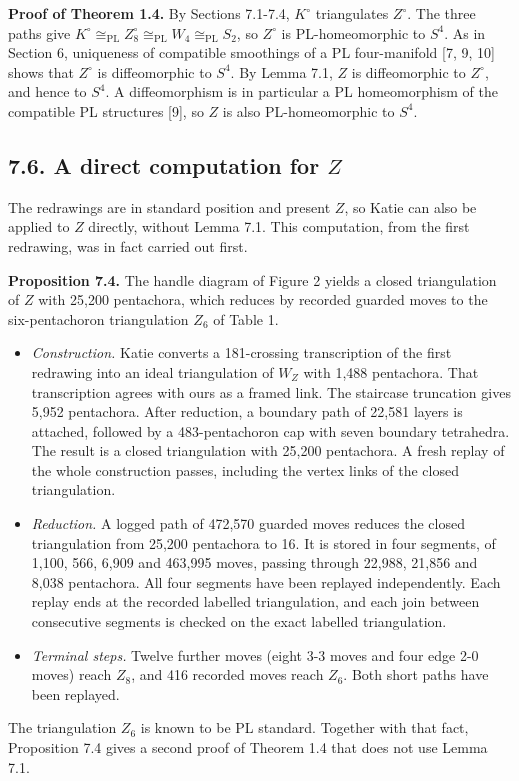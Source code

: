 \documentclass[11pt,letterpaper]{article}
\begin{document}
\medskip\noindent\textbf{Proof of Theorem 1.4.} By Sections 7.1-7.4, $K^\circ$ triangulates $Z^\circ$. The three paths give $K^\circ\cong_{\mathrm{PL}}Z^\circ_8\cong_{\mathrm{PL}}W_4\cong_{\mathrm{PL}}S_2$, so $Z^\circ$ is PL-homeomorphic to $S^4$. As in Section 6, uniqueness of compatible smoothings of a PL four-manifold [7, 9, 10] shows that $Z^\circ$ is diffeomorphic to $S^4$. By Lemma 7.1, $Z$ is diffeomorphic to $Z^\circ$, and hence to $S^4$. A diffeomorphism is in particular a PL homeomorphism of the compatible PL structures [9], so $Z$ is also PL-homeomorphic to $S^4$.

\subsection*{7.6. A direct computation for $Z$}
The redrawings are in standard position and present $Z$, so Katie can also be applied to $Z$ directly, without Lemma 7.1. This computation, from the first redrawing, was in fact carried out first.

\medskip\noindent\textbf{Proposition 7.4.} The handle diagram of Figure 2 yields a closed triangulation of $Z$ with 25,200 pentachora, which reduces by recorded guarded moves to the six-pentachoron triangulation $Z_6$ of Table 1.
\begin{itemize}
\item \emph{Construction.} Katie converts a 181-crossing transcription of the first redrawing into an ideal triangulation of $W_Z$ with 1,488 pentachora. That transcription agrees with ours as a framed link. The staircase truncation gives 5,952 pentachora. After reduction, a boundary path of 22,581 layers is attached, followed by a 483-pentachoron cap with seven boundary tetrahedra. The result is a closed triangulation with 25,200 pentachora. A fresh replay of the whole construction passes, including the vertex links of the closed triangulation.
\item \emph{Reduction.} A logged path of 472,570 guarded moves reduces the closed triangulation from 25,200 pentachora to 16. It is stored in four segments, of 1,100, 566, 6,909 and 463,995 moves, passing through 22,988, 21,856 and 8,038 pentachora. All four segments have been replayed independently. Each replay ends at the recorded labelled triangulation, and each join between consecutive segments is checked on the exact labelled triangulation.
\item \emph{Terminal steps.} Twelve further moves (eight 3-3 moves and four edge 2-0 moves) reach $Z_8$, and 416 recorded moves reach $Z_6$. Both short paths have been replayed.
\end{itemize}
The triangulation $Z_6$ is known to be PL standard. %
Together with that fact, Proposition 7.4 gives a second proof of Theorem 1.4 that does not use Lemma 7.1.
\end{document}
